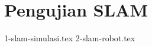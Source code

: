 \section{Pengujian SLAM}
\label{sec:pengujianslam}

\textcolor{red}{\lipsum[1-2]}

{1-slam-simulasi.tex}
{2-slam-robot.tex}
